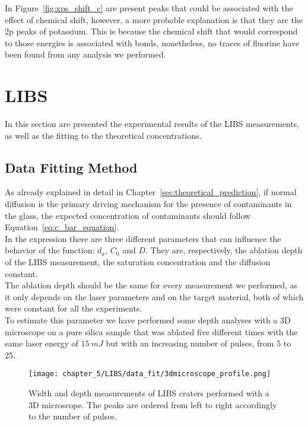 In Figure~\ref{fig:xps_shift_c} are present peaks that could be associated with the effect of chemical shift, however, a more probable explanation is that they are the 2p peaks of potassium. This is because the chemical shift that would correspond to those energies is associated with  bonds, nonetheless, no traces of fluorine have been found from any analysis we performed.

\section{LIBS}
\label{sec:LIBS_measurements}

In this section are presented the experimental results of the LIBS measurements, as well as the fitting to the theoretical concentrations.
\subsection{Data Fitting Method}
\label{subsec:data_fitting}
As already explained in detail in Chapter~\ref{sec:theoretical_prediction}, if normal diffusion is the primary driving mechanism for the presence of contaminants in the glass, the expected concentration of contaminants should follow Equation~\ref{eq:c_bar_equation}.
\\
In the expression there are three different parameters that can influence the behavior of the function: $d_a$, $C_0$ and $D$. They are, respectively, the ablation depth of the LIBS measurement, the saturation concentration and the diffusion constant.
\\
The ablation depth should be the same for every measurement we performed, as it only depends on the laser parameters and on the target material, both of which were constant for all the experiments.
\\
To estimate this parameter we have performed some depth analyses with a 3D microscope on a pure silica sample that was ablated five different times with the same laser energy of $15 \: mJ$ but with an increasing number of pulses, from 5 to 25.

\begin{figure}[H]
    \centering
    \texttt{[image: chapter\_5/LIBS/data\_fit/3dmicroscope\_profile.png]} 
    \caption{Width and depth measurements of LIBS craters performed with a 3D microscope. The peaks are ordered from left to right accordingly to the number of pulses.}
    \label{fig:3d_microscope_craters}
 \end{figure}

